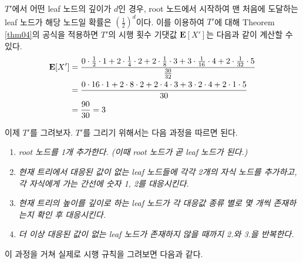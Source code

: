 \documentclass[11pt]{article}
\begin{document}
$T'$에서 어떤 leaf 노드의 깊이가 $d$인 경우, root 노드에서 시작하여 맨 처음에 도달하는 leaf 노드가 해당 노드일 확률은 $\left(\frac{1}{2}\right)^{d}$이다. 이를 이용하여 $T'$에 대해 Theorem \ref{thm04}의 공식을 적용하면 $T'$의 시행 횟수 기댓값 $\textbf{E}[X']$는 다음과 같이 계산할 수 있다.
\[
\begin{split}
\textnormal{\textbf{E}}[X'] & = \frac{0 \cdot \frac{1}{2} \cdot 1 + 2 \cdot \frac{1}{4} \cdot 2 + 2 \cdot \frac{1}{8} \cdot 3 + 3 \cdot \frac{1}{16} \cdot 4 + 2 \cdot \frac{1}{32} \cdot 5}{\frac{30}{32}}\\
& = \frac{0 \cdot 16 \cdot 1 + 2 \cdot 8 \cdot 2 + 2 \cdot 4 \cdot 3 + 3 \cdot 2 \cdot 4 + 2 \cdot 1 \cdot 5}{30}\\
& = \frac{90}{30} = 3
\end{split}
\]

이제 $T'$를 그려보자. $T'$를 그리기 위해서는 다음 과정을 따르면 된다.

\singlespacing
\begin{enumerate}[\itshape1.]
    \item \textit{root 노드를 1개 추가한다. (이때 root 노드가 곧 leaf 노드가 된다.)}
    \item \textit{현재 트리에서 대응된 값이 없는 leaf 노드들에 각각 2개의 자식 노드를 추가하고, 각 자식에게 가는 간선에 숫자 1, 2를 대응시킨다.}
    \item \textit{현재 트리의 높이를 깊이로 하는 leaf 노드가 각 대응값 종류 별로 몇 개씩 존재하는지 확인 후 대응시킨다.}
    \item \textit{더 이상 대응된 값이 없는 leaf 노드가 존재하지 않을 때까지 2.와 3.을 반복한다.}
\end{enumerate}
\doublespacing

\noindent 이 과정을 거쳐 실제로 시행 규칙을 그려보면 다음과 같다.\\
\end{document}
